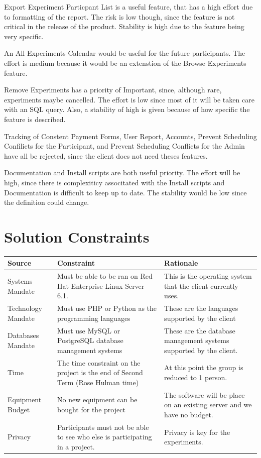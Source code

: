 Export Experiment Particpant List is a useful feature, that has a high effort due to formatting of the report.  The risk is low though, since the feature is not critical in the release of the product.  Stability is high due to the feature being very specific.

An All Experiments Calendar would be useful for the future participants.  The effort is medium because it would be an extenstion of the Browse Experiments feature.

Remove Experiments has a priority of Important, since, although rare, experiments maybe cancelled. The effort is low since most of it will be taken care with an SQL query.  Also, a stability of high is given because of  how specific the feature is described.

Tracking of Constent Payment Forms, User Report, Accounts, Prevent Scheduling Confilicts for the Participant, and Prevent Scheduling Conflicts for the Admin have all be rejected, since the client does not need theses features.

Documentation and Install scripts are both useful priority.  The effort will be high, since there is complexiticy associtated with the Install scripts and Documentation is difficult to keep up to date.  The stability would be low since the definition could change.

\clearpage
\section{Solution Constraints}
\begin{table}[!h]
    \begin{tabular}{|l|p{5.5cm}|p{5.5cm}|}
        \hline
        Source & Constraint & Rationale \\
        \hline
        Systems Mandate & Must be able to be ran on Red Hat Enterprise Linux Server 6.1. & This is the operating system that the client currently uses. \\
        \hline
        Technology Mandate & Must use PHP or Python as the programming languages & These are the languages supported by the client \\
        \hline
        Databases Mandate & Must use MySQL or PostgreSQL database management systems & These are the database management systems supported by the client. \\
        \hline
        Time  & The time constraint on the project is the end of Second Term (Rose Hulman time) & At this point the group is reduced to 1 person. \\
        \hline
        Equipment Budget & No new equipment can be bought for the project & The software will be place on an existing server and we have no budget. \\
        \hline
        Privacy & Participants must not be able to see who else is participating in a project. & Privacy is key for the experiments. \\
        \hline
    \end{tabular}
\end{table}

